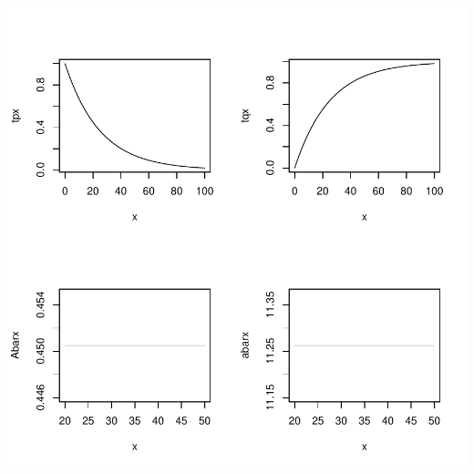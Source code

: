 \documentclass[landscape]{article}
\begin{document}
\includegraphics{survivalModels-001}
\end{document}
